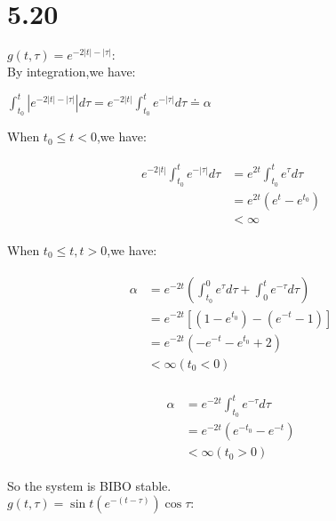 \documentclass{article}
\begin{document}
\section*{5.20}
$g(t, \tau)=e^{-2|t|-|\tau|}:$\\

By integration,we have:\\
\begin{center}
    $\int_{t_0}^t |e^{-2|t|-|\tau|}| d\tau=e^{-2|t|}\int_{t_0}^t e^{-|\tau|} d\tau\doteq \alpha$
\end{center}
When $t_0\leq t <0$,we have:\\
\begin{center}
    \begin{eqnarray*}\begin{split}
    e^{-2|t|}\int_{t_0}^t e^{-|\tau|} d\tau&=e^{2t}\int_{t_0}^t e^{\tau} d\tau\\
    &=e^{2t}(e^t-e^{t_0})\\
    &<\infty
    \end{split}\end{eqnarray*}
\end{center}

When $t_0\leq t,t>0$,we have:\\
\begin{center}
    \begin{eqnarray*}\begin{split}
    \alpha&=e^{-2t}(\int_{t_0}^0 e^{\tau} d\tau+\int_0^t e^{-\tau} d\tau)\\
    &=e^{-2t}[(1-e^{t_0})-(e^{-t}-1)]\\
    &=e^{-2t}(-e^{-t}-e^{t_0}+2)\\
    &<\infty(t_0<0)
    \end{split}\end{eqnarray*}
\end{center}
\begin{center}
    \begin{eqnarray*}\begin{split}
    \alpha&=e^{-2t}\int_{t_0}^t e^{-\tau} d\tau\\
    &=e^{-2t}(e^{-t_0}-e^{-t})\\
    &<\infty(t_0>0)
    \end{split}\end{eqnarray*}
\end{center}

So the system is BIBO stable.\\

$g(t, \tau)=\sin t\left(e^{-(t-\tau)}\right) \cos \tau :$\\
\end{document}
